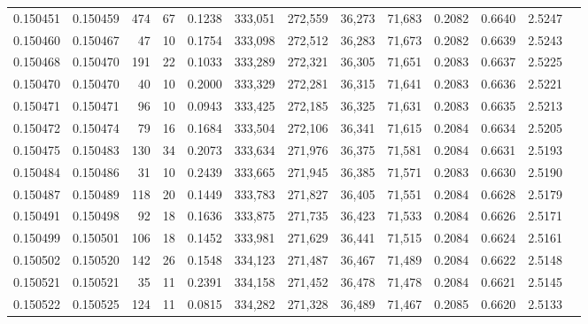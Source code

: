 \begin{tabular}{rrrrrrrrrrrrr}
0.150451 & 0.150459 &   474 &  67 &                                     0.1238 & 333,051 & 272,559 &  36,273 &  71,683 & 0.2082 & 0.6640 & 2.5247 \\
0.150460 & 0.150467 &    47 &  10 &                                     0.1754 & 333,098 & 272,512 &  36,283 &  71,673 & 0.2082 & 0.6639 & 2.5243 \\
0.150468 & 0.150470 &   191 &  22 &                                     0.1033 & 333,289 & 272,321 &  36,305 &  71,651 & 0.2083 & 0.6637 & 2.5225 \\
0.150470 & 0.150470 &    40 &  10 &                                     0.2000 & 333,329 & 272,281 &  36,315 &  71,641 & 0.2083 & 0.6636 & 2.5221 \\
0.150471 & 0.150471 &    96 &  10 &                                     0.0943 & 333,425 & 272,185 &  36,325 &  71,631 & 0.2083 & 0.6635 & 2.5213 \\
0.150472 & 0.150474 &    79 &  16 &                                     0.1684 & 333,504 & 272,106 &  36,341 &  71,615 & 0.2084 & 0.6634 & 2.5205 \\
0.150475 & 0.150483 &   130 &  34 &                                     0.2073 & 333,634 & 271,976 &  36,375 &  71,581 & 0.2084 & 0.6631 & 2.5193 \\
0.150484 & 0.150486 &    31 &  10 &                                     0.2439 & 333,665 & 271,945 &  36,385 &  71,571 & 0.2083 & 0.6630 & 2.5190 \\
0.150487 & 0.150489 &   118 &  20 &                                     0.1449 & 333,783 & 271,827 &  36,405 &  71,551 & 0.2084 & 0.6628 & 2.5179 \\
0.150491 & 0.150498 &    92 &  18 &                                     0.1636 & 333,875 & 271,735 &  36,423 &  71,533 & 0.2084 & 0.6626 & 2.5171 \\
0.150499 & 0.150501 &   106 &  18 &                                     0.1452 & 333,981 & 271,629 &  36,441 &  71,515 & 0.2084 & 0.6624 & 2.5161 \\
0.150502 & 0.150520 &   142 &  26 &                                     0.1548 & 334,123 & 271,487 &  36,467 &  71,489 & 0.2084 & 0.6622 & 2.5148 \\
0.150521 & 0.150521 &    35 &  11 &                                     0.2391 & 334,158 & 271,452 &  36,478 &  71,478 & 0.2084 & 0.6621 & 2.5145 \\
0.150522 & 0.150525 &   124 &  11 &                                     0.0815 & 334,282 & 271,328 &  36,489 &  71,467 & 0.2085 & 0.6620 & 2.5133 \\

\end{tabular}
